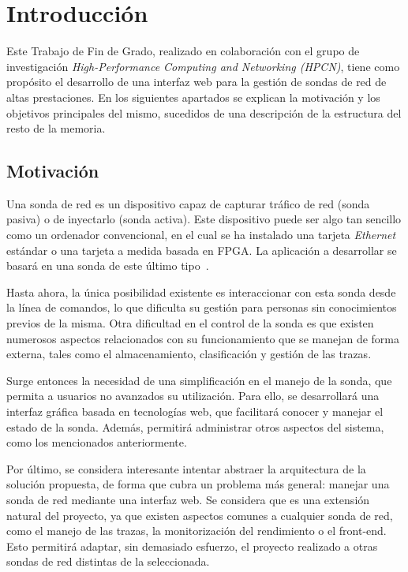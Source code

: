 \chapter{Introducción}

Este Trabajo de Fin de Grado, realizado en colaboración con el grupo de investigación \textit{High-Performance Computing and Networking (HPCN)}, tiene como propósito el desarrollo de una interfaz web para la gestión de sondas de red de altas prestaciones.
En los siguientes apartados se explican la motivación y los objetivos principales del mismo, sucedidos de una descripción de la estructura del resto de la memoria.

\section{Motivación}

Una sonda de red es un dispositivo capaz de capturar tráfico de red (sonda pasiva) o de inyectarlo (sonda activa).
Este dispositivo puede ser algo tan sencillo como un ordenador convencional, en el cual se ha instalado una tarjeta \textit{Ethernet} estándar o una tarjeta a medida basada en \gls{FPGA}.
La aplicación a desarrollar se basará en una sonda de este último tipo~\cite{jfzazo}.

Hasta ahora, la única posibilidad existente es interaccionar con esta sonda desde la línea de comandos, lo que dificulta su gestión para personas sin conocimientos previos de la misma.
Otra dificultad en el control de la sonda es que existen numerosos aspectos relacionados con su funcionamiento que se manejan de forma externa, tales como el almacenamiento, clasificación y gestión de las \glspl{traza}.

Surge entonces la necesidad de una simplificación en el manejo de la sonda, que permita a usuarios no avanzados su utilización.
Para ello, se desarrollará una interfaz gráfica basada en tecnologías web, que facilitará conocer y manejar el estado de la sonda.
Además, permitirá administrar otros aspectos del sistema, como los mencionados anteriormente.

Por último, se considera interesante intentar abstraer la arquitectura de la solución propuesta, de forma que cubra un problema más general: manejar una sonda de red mediante una interfaz web.
Se considera que es una extensión natural del proyecto, ya que existen aspectos comunes a cualquier sonda de red, como el manejo de las \glspl{traza}, la monitorización del rendimiento o el \gls{front-end}.
Esto permitirá adaptar, sin demasiado esfuerzo, el proyecto realizado a otras sondas de red distintas de la seleccionada.

